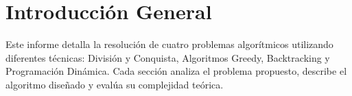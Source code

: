 \section{Introducción General}

Este informe detalla la resolución de cuatro problemas algorítmicos utilizando diferentes técnicas: División y Conquista, Algoritmos Greedy, 
Backtracking y Programación Dinámica. Cada sección analiza el problema propuesto, describe el algoritmo diseñado y evalúa su complejidad teórica.
